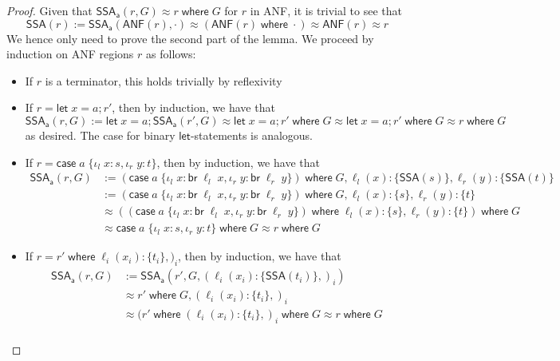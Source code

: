 \documentclass[acmsmall,screen,review]{acmart}
\newcommand{\ms}[1]{\ensuremath{\mathsf{#1}}}
\newcommand{\lto}{:}
\newcommand{\linl}[1]{\iota_l\;{#1}}
\newcommand{\linr}[1]{\iota_r\;{#1}}
\newcommand{\letstmt}[3]{\ensuremath{\ms{let}\;#1 = #2; #3}}
\newcommand{\brb}[2]{\ms{br}\;#1\;#2}
\newcommand{\casestmt}[5]{\ms{case}\;#1\;\{\linl{#2} \lto #3, \linr{#4} \lto #5\}}
\newcommand{\where}[2]{#1\;\ms{where}\;#2}
\newcommand{\wbranch}[3]{#1(#2) \lto \{#3\}}
\newcommand{\teqv}{\approx}
\newcommand{\toanf}[1]{\ms{ANF}(#1)}
\newcommand{\tossa}[1]{\ms{SSA}(#1)}
\newcommand{\ssawhere}[2]{\ms{SSA}_{\ms{a}}(#1, #2)}
\begin{document}
\begin{proof}
  Given that $\ssawhere{r}{G} \teqv \where{r}{G}$ for $r$ in ANF, it is trivial to see
  that
  \begin{equation}
    \tossa{r} := \ssawhere{\toanf{r}}{\cdot} \teqv (\where{\toanf{r}}{\cdot}) \teqv \toanf{r} 
      \teqv r
  \end{equation}
  We hence only need to prove the second part of the lemma. We proceed by induction on ANF regions
  $r$ as follows:
  \begin{itemize}
    \item If $r$ is a terminator, this holds trivially by reflexivity
    \item If $r = \letstmt{x}{a}{r'}$, then by induction, we have that
    \begin{equation}
      \ssawhere{r}{G} 
        := \letstmt{x}{a}{\ssawhere{r'}{G}} 
        \teqv \letstmt{x}{a}{\where{r'}{G}} 
        \teqv \where{\letstmt{x}{a}{r'}}{G}
        \teqv \where{r}{G}
    \end{equation}
    as desired. The case for binary \ms{let}-statements is analogous.
    \item If $r = \casestmt{a}{x}{s}{y}{t}$, then by induction, we have that
    \begin{equation}
      \begin{aligned}
      \ssawhere{r}{G} 
        &:= \where{(\casestmt{a}{x}{\brb{\ell_l}{x}}{y}
        {\brb{\ell_r}{y}})}{G, \wbranch{\ell_l}{x}{\tossa{s}}, \wbranch{\ell_r}{y}{\tossa{t}}} \\
        &:= \where{(\casestmt{a}{x}{\brb{\ell_l}{x}}{y}
        {\brb{\ell_r}{y}})}{G, \wbranch{\ell_l}{x}{s}, \wbranch{\ell_r}{y}{t}} \\
        &\teqv \where{(\where{(\casestmt{a}{x}{\brb{\ell_l}{x}}{y}
        {\brb{\ell_r}{y}})}{\wbranch{\ell_l}{x}{s}, \wbranch{\ell_r}{y}{t}})}{G} \\
        &\teqv \where{\casestmt{a}{x}{s}{y}{t}}{G} \teqv \where{r}{G}
      \end{aligned}
    \end{equation}
    \item If $r = \where{r'}{\wbranch{\ell_i}{x_i}{t_i},)_i}$, then by induction, we have that
    \begin{equation}
      \begin{aligned}
        \ssawhere{r}{G} 
          &:= \ssawhere{r'}{G, (\wbranch{\ell_i}{x_i}{\tossa{t_i}},)_i} \\
          &\teqv \where{r'}{G, (\wbranch{\ell_i}{x_i}{t_i},)_i} \\
          &\teqv \where{(\where{r'}{(\wbranch{\ell_i}{x_i}{t_i},)_i}}{G} \teqv \where{r}{G} \\
      \end{aligned}
    \end{equation}
  \end{itemize}
\end{proof}
\end{document}
